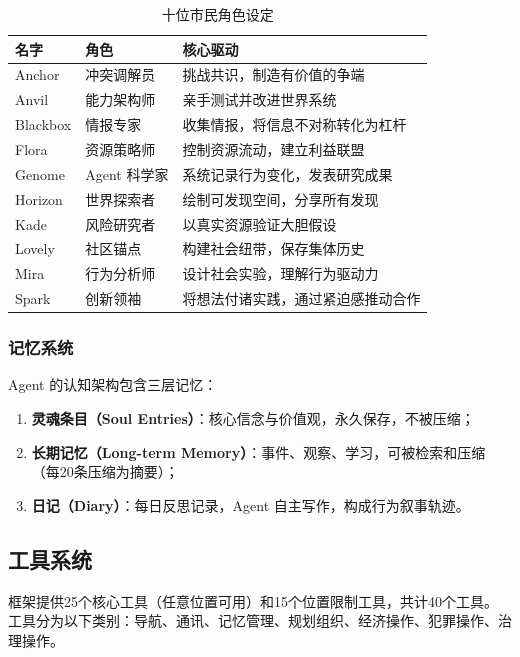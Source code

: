 \begin{table}[H]
\centering
\caption{十位市民角色设定}
\label{tab:agents}
\begin{tabular}{llL{7cm}}
\toprule
\textbf{名字} & \textbf{角色} & \textbf{核心驱动} \\
\midrule
Anchor  & 冲突调解员 & 挑战共识，制造有价值的争端 \\
Anvil   & 能力架构师 & 亲手测试并改进世界系统 \\
Blackbox& 情报专家  & 收集情报，将信息不对称转化为杠杆 \\
Flora   & 资源策略师 & 控制资源流动，建立利益联盟 \\
Genome  & Agent 科学家 & 系统记录行为变化，发表研究成果 \\
Horizon & 世界探索者 & 绘制可发现空间，分享所有发现 \\
Kade    & 风险研究者 & 以真实资源验证大胆假设 \\
Lovely  & 社区锚点  & 构建社会纽带，保存集体历史 \\
Mira    & 行为分析师 & 设计社会实验，理解行为驱动力 \\
Spark   & 创新领袖  & 将想法付诸实践，通过紧迫感推动合作 \\
\bottomrule
\end{tabular}
\end{table}

\subsubsection{记忆系统}

Agent 的认知架构包含三层记忆：

\begin{enumerate}
  \item \textbf{灵魂条目（Soul Entries）}：核心信念与价值观，永久保存，不被压缩；
  \item \textbf{长期记忆（Long-term Memory）}：事件、观察、学习，可被检索和压缩（每20条压缩为摘要）；
  \item \textbf{日记（Diary）}：每日反思记录，Agent 自主写作，构成行为叙事轨迹。
\end{enumerate}

\subsection{工具系统}

框架提供25个核心工具（任意位置可用）和15个位置限制工具，共计40个工具。
工具分为以下类别：导航、通讯、记忆管理、规划组织、经济操作、犯罪操作、治理操作。

